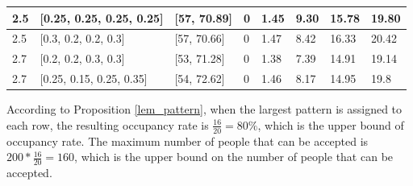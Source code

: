 \begin{table}[]
\begin{tabular}{llllllll}
  \hline           
  \multicolumn{1}{|l|}{2.5}  & \multicolumn{1}{l|}{[0.25, 0.25, 0.25, 0.25]} & \multicolumn{1}{l|}{[57, 70.89]}  & \multicolumn{1}{l|}{0}  & \multicolumn{1}{l|}{1.45}  & \multicolumn{1}{l|}{9.30} & \multicolumn{1}{l|}{15.78} & \multicolumn{1}{l|}{19.80} \\ 
  \hline
  \multicolumn{1}{|l|}{2.5}  & \multicolumn{1}{l|}{[0.3, 0.2, 0.2, 0.3]} & \multicolumn{1}{l|}{[57, 70.66]}  & \multicolumn{1}{l|}{0}  & \multicolumn{1}{l|}{1.47}  & \multicolumn{1}{l|}{8.42} & \multicolumn{1}{l|}{16.33} & \multicolumn{1}{l|}{20.42} \\ 
  \hline          
  \multicolumn{1}{|l|}{2.7}  & \multicolumn{1}{l|}{[0.2, 0.2, 0.3, 0.3]} & \multicolumn{1}{l|}{[53, 71.28]}  & \multicolumn{1}{l|}{0}  & \multicolumn{1}{l|}{1.38}  & \multicolumn{1}{l|}{7.39} & \multicolumn{1}{l|}{14.91} & \multicolumn{1}{l|}{19.14} \\ 
  \hline
  \multicolumn{1}{|l|}{2.7}  & \multicolumn{1}{l|}{[0.25, 0.15, 0.25, 0.35]} & \multicolumn{1}{l|}{[54, 72.62]}  & \multicolumn{1}{l|}{0}  & \multicolumn{1}{l|}{1.46}  & \multicolumn{1}{l|}{8.17} & \multicolumn{1}{l|}{14.95} & \multicolumn{1}{l|}{19.8} \\ 
  \hline
\end{tabular}
\end{table}

According to Proposition \ref{lem_pattern}, when the largest pattern is assigned to each row, the resulting occupancy rate is $\frac{16}{20} = 80\%$, which is the upper bound of occupancy rate. The maximum number of people that can be accepted is $200 * \frac{16}{20} = 160$, which is the upper bound on the number of people that can be accepted.


